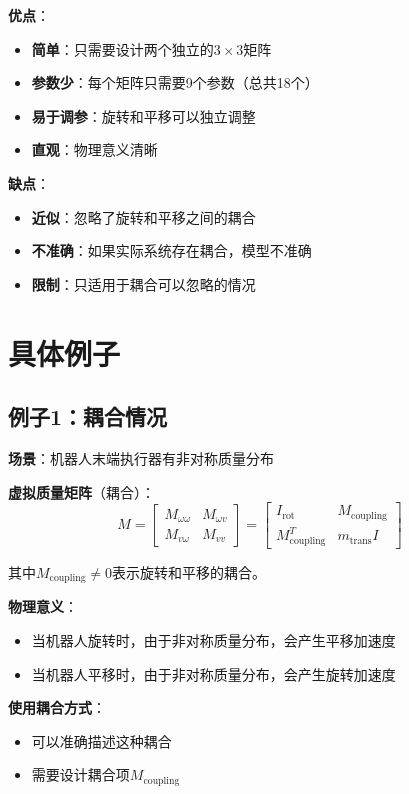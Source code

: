 \documentclass[12pt,a4paper]{article}
\begin{document}
\textbf{优点}：
\begin{itemize}
\item \textbf{简单}：只需要设计两个独立的$3 \times 3$矩阵
\item \textbf{参数少}：每个矩阵只需要9个参数（总共18个）
\item \textbf{易于调参}：旋转和平移可以独立调整
\item \textbf{直观}：物理意义清晰
\end{itemize}

\textbf{缺点}：
\begin{itemize}
\item \textbf{近似}：忽略了旋转和平移之间的耦合
\item \textbf{不准确}：如果实际系统存在耦合，模型不准确
\item \textbf{限制}：只适用于耦合可以忽略的情况
\end{itemize}

\section{具体例子}

\subsection{例子1：耦合情况}

\textbf{场景}：机器人末端执行器有非对称质量分布

\textbf{虚拟质量矩阵}（耦合）：
\begin{equation}
M = \begin{bmatrix}
M_{\omega\omega} & M_{\omega v} \\
M_{v\omega} & M_{vv}
\end{bmatrix} = \begin{bmatrix}
I_{\text{rot}} & M_{\text{coupling}} \\
M_{\text{coupling}}^T & m_{\text{trans}}I
\end{bmatrix}
\end{equation}

其中$M_{\text{coupling}} \neq 0$表示旋转和平移的耦合。

\textbf{物理意义}：
\begin{itemize}
\item 当机器人旋转时，由于非对称质量分布，会产生平移加速度
\item 当机器人平移时，由于非对称质量分布，会产生旋转加速度
\end{itemize}

\textbf{使用耦合方式}：
\begin{itemize}
\item 可以准确描述这种耦合
\item 需要设计耦合项$M_{\text{coupling}}$
\end{itemize}
\end{document}

